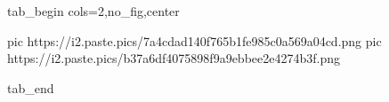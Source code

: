  
 
 
 
 

\ifcmt
  tab_begin cols=2,no_fig,center

     pic https://i2.paste.pics/7a4cdad140f765b1fe985c0a569a04cd.png
		 pic https://i2.paste.pics/b37a6df4075898f9a9ebbee2e4274b3f.png

  tab_end
\fi
